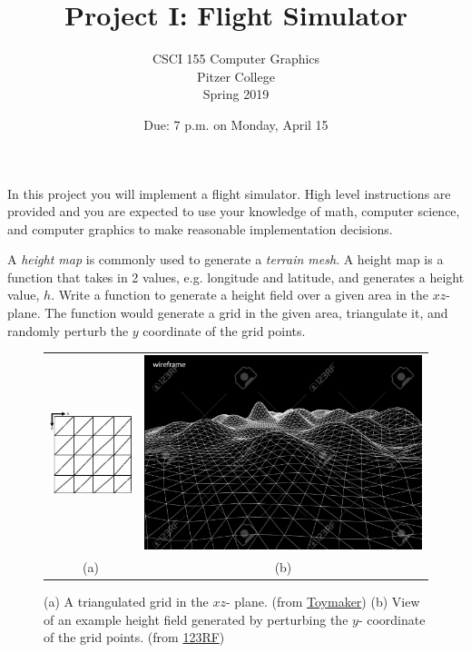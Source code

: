\documentclass[addpoints]{exam}
\title{Project I: Flight Simulator}
\author{CSCI 155 Computer Graphics\\Pitzer College\\Spring 2019}
\date{Due: 7 p.m. on Monday, April 15}
\begin{document}
\maketitle
\thispagestyle{empty}

In this project you will implement a flight simulator. High level instructions are provided and you are expected to use your knowledge of math, computer science, and computer graphics to make reasonable implementation decisions.

\begin{questions}


  A \textit{height map} is commonly used to generate a \textit{terrain mesh}. A height map is a function that takes in 2 values, e.g. longitude and latitude, and generates a height value, $h$. Write a function to generate a height field over a given area in the $xz$- plane. The function would generate a grid in the given area, triangulate it, and randomly perturb the $y$ coordinate of the grid points.
  \begin{figure}[!h]
    \centering
    \begin{tabular}{cc}
      \includegraphics[height=.35\textwidth]{terrain1}
      & \includegraphics[height=.35\textwidth]{terrain2}\\
      (a) & (b)
    \end{tabular}
    \caption{(a) A triangulated grid in the $xz$- plane. (from \href{http://keithditch.powweb.com/Games/XNA/html/xna\_terrain.html}{Toymaker}) (b) View of an example height field generated by perturbing the $y$- coordinate of the grid points. (from \href{https://www.123rf.com/photo_54102307_stock-vector-3d-wireframe-terrain-contour-vector.html}{123RF})}
  \end{figure}


\end{questions}
\end{document}
